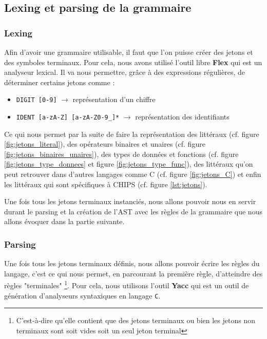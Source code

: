 \documentclass[a4paper, 11pt]{article}
\DeclareRobustCommand{\prog}[1]{\begingroup\urlstyle{tt}\nolinkurl{#1}\endgroup}
\newcommand{\kw}[1]{\textbf{#1}}
\begin{document}
\subsection{Lexing et parsing de la grammaire}


\subsubsection{Lexing}

Afin d'avoir une grammaire utilisable, il faut que l’on puisse créer des jetons et des symboles terminaux. Pour cela, nous avons utilisé l'outil libre \kw{Flex} qui est un analyseur lexical. Il va nous permettre, grâce à des expressions régulières, de déterminer certains jetons comme :
\begin{itemize}
    \item \prog{DIGIT [0-9]} $\longrightarrow$ représentation d'un chiffre
    \item \prog{IDENT [a-zA-Z] [a-zA-Z0-9\_]*} $\longrightarrow$ représentation des identifiants
\end{itemize}

Ce qui nous permet par la suite de faire la représentation des littéraux (cf. figure \ref{fig:jetons_literal}), des opérateurs binaires et unaires (cf. figure \ref{fig:jetons_binaires_unaires}), des types de données et fonctions (cf. figure \ref{fig:jetons_type_donnees} et figure \ref{fig:jetons_type_func}), des littéraux qu'on peut retrouver dans d'autres langages comme C (cf. figure \ref{fig:jetons_C}) et enfin les littéraux qui sont spécifiques à CHIPS (cf. figure \ref{lst:jetons}).

Une fois tous les jetons terminaux instanciés, nous allons pouvoir nous en servir durant le parsing et la création de l'AST avec les règles de la grammaire que nous allons évoquer dans la partie suivante.

\newpage
\subsubsection{Parsing}

Une fois tous les jetons terminaux définis, nous allons pouvoir écrire les règles du langage, c'est ce qui nous permet, en parcourant la première règle, d'atteindre des règles "terminales" \footnote{C'est-à-dire qu'elle contient que des jetons terminaux ou bien les jetons non terminaux sont soit vides soit un seul jeton terminal}. Pour cela, nous utilisons l'outil \kw{Yacc} qui est un outil de génération d'analyseurs syntaxiques en langage \prog{C}.
\end{document}
